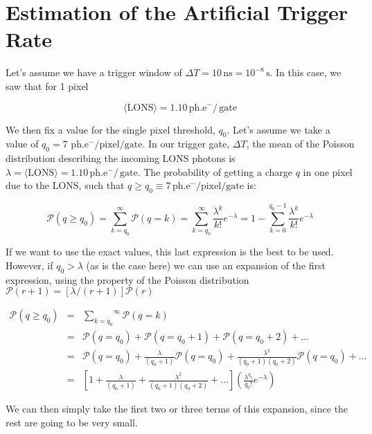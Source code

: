 \documentclass{article}
\def\phe{\u{ph.e^{-}}\xspace}
\def\Time{\ensuremath{\Delta T}\xspace}
\renewcommand{\u}[1]{\ensuremath{\,\mathrm{#1}}}  %
\begin{document}
\section*{Estimation of the Artificial Trigger Rate}

Let's assume we have a trigger window of $\Time = 10\u{ns} =
10^{-8}\u{s}$. In this case, we saw that for 1 pixel

\begin{equation*}
\langle\text{LONS}\rangle = 1.10 \phe/\u{gate}
\end{equation*}

We then fix a value for the single pixel threshold, $q_0$. Let's
assume we take a value of $q_0 =
7\,\phe/\mathrm{pixel}/\mathrm{gate}$.  In our trigger gate, \Time,
the mean of the Poisson distribution describing the incoming LONS
photons is $\lambda = \langle\text{LONS}\rangle = 1.10
\phe/\u{gate}$.  The probability of getting a charge $q$ in one
pixel due to the LONS, such that $q \geq q_0 \equiv
7\phe/\mathrm{pixel}/\mathrm{gate}$ is:

\begin{equation*}
\mathcal{P}(q \geq q_0) = 
\overset{\infty}{\underset{k=q_0}\sum} \mathcal{P}(q = k) =
\overset{\infty}{\underset{k=q_0}\sum}
\frac{\lambda^k}{k!}e^{-\lambda} =
1-\overset{q_0-1}{\underset{k=0}\sum} 
\frac{\lambda^k}{k!}e^{-\lambda}
\end{equation*}

If we want to use the exact values, this last expression is the best
to be used. However, if $q_0 > \lambda$ (as is the case here) we can
use an expansion of the first expression, using the property of the
Poisson distribution $\mathcal{P}(r+1) = [\lambda/(r+1)]\mathcal{P}(r)$

\begin{eqnarray*} 
\mathcal{P}(q \geq q_0) &=& 
\overset{\infty}{\underset{k=q_0}\sum} \mathcal{P}(q = k) \\
&=& \mathcal{P}(q = q_0) + \mathcal{P}(q = q_0+1) +  
\mathcal{P}(q = q_0+2) + \ldots \\
&=& \mathcal{P}(q = q_0) + 
\frac{\lambda}{(q_0+1)} \mathcal{P}(q = q_0) +
\frac{\lambda^2}{(q_0+1)(q_0+2)} \mathcal{P}(q = q_0) + \ldots \\
&=& \left[
1 + \frac{\lambda}{(q_0+1)} + \frac{\lambda^2}{(q_0+1)(q_0+2)} + \ldots
\right] \left( \frac{\lambda^{q_0}}{q_0!}e^{-\lambda} \right)
\end{eqnarray*}

We can then simply take the first two or three terms of this
expansion, since the rest are going to be very small.
\end{document}
